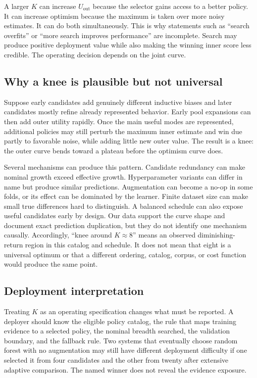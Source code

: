 \documentclass[referee]{USG}
\newcommand{\uouter}{\ensuremath{U_{\mathrm{out}}}}
\begin{document}
A larger $K$ can increase $\uouter$ because the selector gains access to a better policy. It can increase optimism because the maximum is taken over more noisy estimates. It can do both simultaneously. This is why statements such as ``search overfits'' or ``more search improves performance'' are incomplete. Search may produce positive deployment value while also making the winning inner score less credible. The operating decision depends on the joint curve.

\subsection{Why a knee is plausible but not universal}
Suppose early candidates add genuinely different inductive biases and later candidates mostly refine already represented behavior. Early pool expansions can then add outer utility rapidly. Once the main useful modes are represented, additional policies may still perturb the maximum inner estimate and win due partly to favorable noise, while adding little new outer value. The result is a knee: the outer curve bends toward a plateau before the optimism curve does.

Several mechanisms can produce this pattern. Candidate redundancy can make nominal growth exceed effective growth. Hyperparameter variants can differ in name but produce similar predictions. Augmentation can become a no-op in some folds, or its effect can be dominated by the learner. Finite dataset size can make small true differences hard to distinguish. A balanced schedule can also expose useful candidates early by design. Our data support the curve shape and document exact prediction duplication, but they do not identify one mechanism causally. Accordingly, ``knee around $K\approx8$'' means an observed diminishing-return region in this catalog and schedule. It does not mean that eight is a universal optimum or that a different ordering, catalog, corpus, or cost function would produce the same point.

\subsection{Deployment interpretation}
Treating $K$ as an operating specification changes what must be reported. A deployer should know the eligible policy catalog, the rule that maps training evidence to a selected policy, the nominal breadth searched, the validation boundary, and the fallback rule. Two systems that eventually choose random forest with no augmentation may still have different deployment difficulty if one selected it from four candidates and the other from twenty after extensive adaptive comparison. The named winner does not reveal the evidence exposure.
\end{document}
